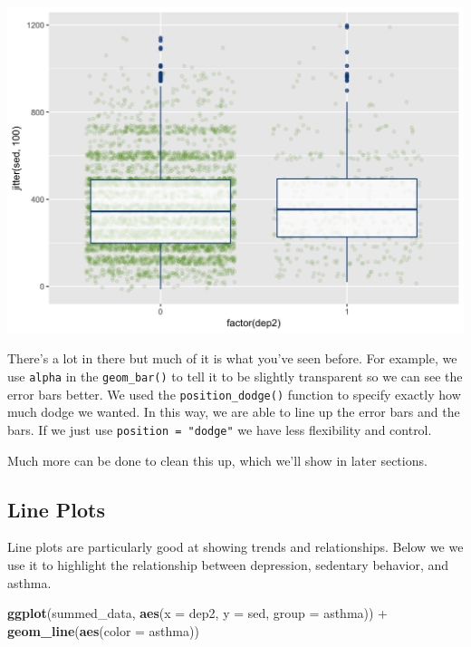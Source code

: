 \documentclass[]{tufte-book}
\newenvironment{Shaded}{}{}
\newcommand{\KeywordTok}[1]{\textcolor[rgb]{0.00,0.44,0.13}{\textbf{#1}}}
\newcommand{\DataTypeTok}[1]{\textcolor[rgb]{0.56,0.13,0.00}{#1}}
\newcommand{\StringTok}[1]{\textcolor[rgb]{0.25,0.44,0.63}{#1}}
\newcommand{\OperatorTok}[1]{\textcolor[rgb]{0.40,0.40,0.40}{#1}}
\newcommand{\NormalTok}[1]{#1}
\theoremstyle{definition}
\theoremstyle{definition}
\theoremstyle{remark}
\begin{document}
\includegraphics{_main_files/figure-latex/unnamed-chunk-139-1}

There's a lot in there but much of it is what you've seen before. For
example, we use \texttt{alpha} in the \texttt{geom\_bar()} to tell it to
be slightly transparent so we can see the error bars better. We used the
\texttt{position\_dodge()} function to specify exactly how much dodge we
wanted. In this way, we are able to line up the error bars and the bars.
If we just use \texttt{position\ =\ "dodge"} we have less flexibility
and control.

Much more can be done to clean this up, which we'll show in later
sections.

\subsection*{Line Plots}\label{line-plots}

Line plots are particularly good at showing trends and relationships.
Below we we use it to highlight the relationship between depression,
sedentary behavior, and asthma.

\begin{Shaded}
\begin{Highlighting}[]
\KeywordTok{ggplot}\NormalTok{(summed_data, }\KeywordTok{aes}\NormalTok{(}\DataTypeTok{x =}\NormalTok{ dep2, }\DataTypeTok{y =}\NormalTok{ sed, }\DataTypeTok{group =}\NormalTok{ asthma)) }\OperatorTok{+}\StringTok{ }
\StringTok{    }\KeywordTok{geom_line}\NormalTok{(}\KeywordTok{aes}\NormalTok{(}\DataTypeTok{color =}\NormalTok{ asthma))}
\end{Highlighting}
\end{Shaded}
\end{document}
